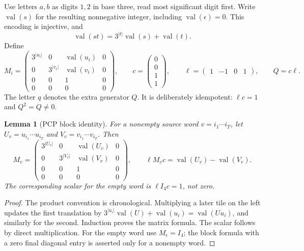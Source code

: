 \documentclass[11pt,letterpaper]{article}
\newtheorem{lemma}[theorem]{Lemma}
\theoremstyle{definition}
\theoremstyle{remark}
\newcommand{\code}{\operatorname{val}}
\begin{document}
Use letters $a,b$ as digits $1,2$ in base three, read most significant digit first.
Write $\code(s)$ for the resulting nonnegative integer, including
$\code(\epsilon)=0$. This encoding is injective, and
\begin{equation}
 \code(st)=3^{|t|}\code(s)+\code(t).
 \label{ste:ee:eq:stringcode}
\end{equation}
Define
\begin{equation}
 M_i=\begin{pmatrix}
 3^{|u_i|}&0&\code(u_i)&0\\
 0&3^{|v_i|}&\code(v_i)&0\\
 0&0&1&0\\
 0&0&0&0
 \end{pmatrix},\qquad
 c=\begin{pmatrix}0\\0\\1\\1\end{pmatrix},\qquad
 \ell=\begin{pmatrix}1&-1&0&1\end{pmatrix},\qquad Q=c\ell.
 \label{ste:ee:eq:pcp-matrices}
\end{equation}
The letter $q$ denotes the extra generator $Q$. It is deliberately idempotent:
$\ell c=1$ and $Q^2=Q\ne0$.

\begin{lemma}[PCP block identity]\label{ste:ee:lem:pcpblock}
For a nonempty source word $v=i_1\cdots i_T$, let
$U_v=u_{i_1}\cdots u_{i_T}$ and $V_v=v_{i_1}\cdots v_{i_T}$. Then
\[
 M_v=\begin{pmatrix}
 3^{|U_v|}&0&\code(U_v)&0\\
 0&3^{|V_v|}&\code(V_v)&0\\
 0&0&1&0\\
 0&0&0&0
 \end{pmatrix},\qquad
 \ell M_vc=\code(U_v)-\code(V_v).
\]
The corresponding scalar for the empty word is $\ell I_4c=1$, not zero.
\end{lemma}
\begin{proof}
The product convention is chronological. Multiplying a later tile on the left
updates the first translation by
$3^{|u_i|}\code(U)+\code(u_i)=\code(Uu_i)$, and similarly for the second.
Induction proves the matrix formula. The scalar follows by direct multiplication.
For the empty word use $M_\epsilon=I_4$; the block formula with a zero final
diagonal entry is asserted only for a nonempty word.
\end{proof}
\end{document}
